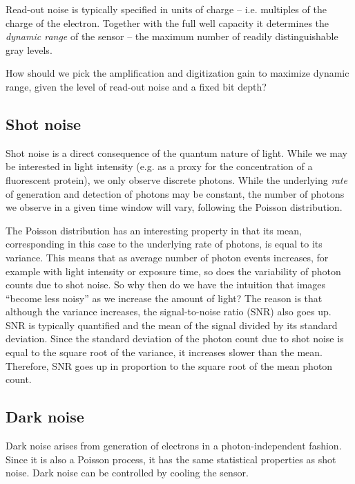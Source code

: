 \documentclass[a4paper]{report}
\newcommand{\nexercise}[0]{\arabic{exercises}\addtocounter{exercises}{1}}
\begin{document}
Read-out noise is typically specified in units of charge -- i.e. multiples of the charge of the electron. 
Together with the full well capacity it determines the \textit{dynamic range} of the sensor -- the maximum number of readily distinguishable gray levels. 

\begin{exercisebox}[frametitle={Exercise \nexercise: Picking optimal gain}]
How should we pick the amplification and digitization gain to maximize dynamic range, given the level of read-out noise and a fixed bit depth?
\end{exercisebox}

\subsection{Shot noise}
Shot noise is a direct consequence of the quantum nature of light. While we may be interested in light intensity (e.g. as a proxy for the concentration of a fluorescent protein), we only observe discrete photons. 
While the underlying \textit{rate} of generation and detection of photons may be constant, the number of photons we observe in a given time window will vary, following the Poisson distribution.

The Poisson distribution has an interesting property in that its mean, corresponding in this case to the underlying rate of photons, is equal to its variance.
This means that as average number of photon events increases, for example with light intensity or exposure time, so does the variability of photon counts due to shot noise.
So why then do we have the intuition that images ``become less noisy'' as we increase the amount of light? 
The reason is that although the variance increases, the signal-to-noise ratio (SNR) also goes up. 
SNR is typically quantified and the mean of the signal divided by its standard deviation. 
Since the standard deviation of the photon count due to shot noise is equal to the square root of the variance, it increases slower than the mean. 
Therefore, SNR goes up in proportion to the square root of the mean photon count.



\subsection{Dark noise}
Dark noise arises from generation of electrons in a photon-independent fashion. 
Since it is also a Poisson process, it has the same statistical properties as shot noise. 
Dark noise can be controlled by cooling the sensor.
\end{document}
